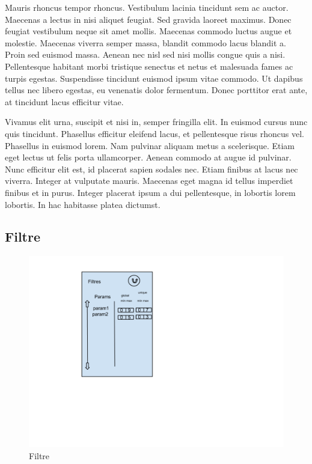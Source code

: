 		Mauris rhoncus tempor rhoncus. Vestibulum lacinia tincidunt sem ac auctor. Maecenas a lectus in nisi aliquet feugiat. Sed gravida laoreet maximus. Donec feugiat vestibulum neque sit amet mollis. Maecenas commodo luctus augue et molestie. Maecenas viverra semper massa, blandit commodo lacus blandit a. Proin sed euismod massa. Aenean nec nisl sed nisi mollis congue quis a nisi. Pellentesque habitant morbi tristique senectus et netus et malesuada fames ac turpis egestas. Suspendisse tincidunt euismod ipsum vitae commodo. Ut dapibus tellus nec libero egestas, eu venenatis dolor fermentum. Donec porttitor erat ante, at tincidunt lacus efficitur vitae.

		Vivamus elit urna, suscipit et nisi in, semper fringilla elit. In euismod cursus nunc quis tincidunt. Phasellus efficitur eleifend lacus, et pellentesque risus rhoncus vel. Phasellus in euismod lorem. Nam pulvinar aliquam metus a scelerisque. Etiam eget lectus ut felis porta ullamcorper. Aenean commodo at augue id pulvinar. Nunc efficitur elit est, id placerat sapien sodales nec. Etiam finibus at lacus nec viverra. Integer at vulputate mauris. Maecenas eget magna id tellus imperdiet finibus et in purus. Integer placerat ipsum a dui pellentesque, in lobortis lorem lobortis. In hac habitasse platea dictumst. 

	\subsection{Filtre}
		\begin{figure}
			\begin{center}
				\includegraphics[width=1\textwidth]{figure/filtre.png}
			\end{center}
			\caption{Filtre}
			\label{fig:filtre}
		\end{figure}


